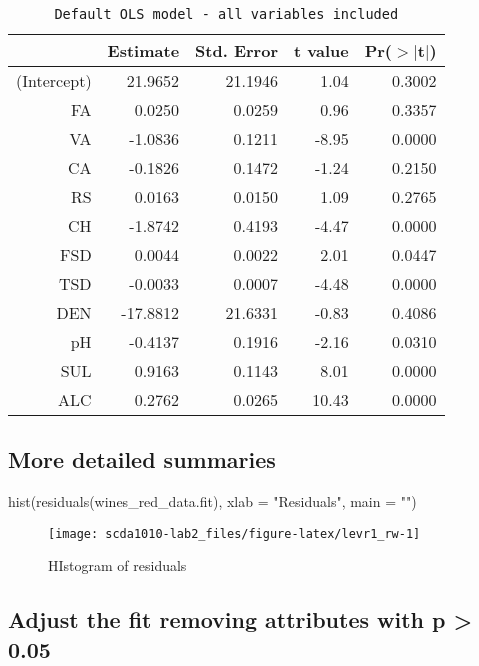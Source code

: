 \begin{table}[ht]
\centering
\begin{tabular}{rrrrr}
  \hline
 & Estimate & Std. Error & t value & Pr($>$$|$t$|$) \\ 
  \hline
(Intercept) & 21.9652 & 21.1946 & 1.04 & 0.3002 \\ 
  FA & 0.0250 & 0.0259 & 0.96 & 0.3357 \\ 
  VA & -1.0836 & 0.1211 & -8.95 & 0.0000 \\ 
  CA & -0.1826 & 0.1472 & -1.24 & 0.2150 \\ 
  RS & 0.0163 & 0.0150 & 1.09 & 0.2765 \\ 
  CH & -1.8742 & 0.4193 & -4.47 & 0.0000 \\ 
  FSD & 0.0044 & 0.0022 & 2.01 & 0.0447 \\ 
  TSD & -0.0033 & 0.0007 & -4.48 & 0.0000 \\ 
  DEN & -17.8812 & 21.6331 & -0.83 & 0.4086 \\ 
  pH & -0.4137 & 0.1916 & -2.16 & 0.0310 \\ 
  SUL & 0.9163 & 0.1143 & 8.01 & 0.0000 \\ 
  ALC & 0.2762 & 0.0265 & 10.43 & 0.0000 \\ 
   \hline
\end{tabular}
\caption{\tt Default OLS model - all variables included} 
\label{table:fit1}
\end{table}

\hypertarget{more-detailed-summaries}{%
\subsection{More detailed summaries}\label{more-detailed-summaries}}

\begin{Schunk}
\begin{Sinput}
hist(residuals(wines_red_data.fit), xlab = "Residuals", main = "")
\end{Sinput}
\begin{figure}[h]

{\centering \texttt{[image: scda1010-lab2\_files/figure-latex/levr1\_rw-1]} 

}

\caption[HIstogram of residuals]{HIstogram of residuals}\label{fig:levr1_rw}
\end{figure}
\end{Schunk}

\hypertarget{adjust-the-fit-removing-attributes-with-p-0.05}{%
\subsection{Adjust the fit removing attributes with p \textgreater{}
0.05}\label{adjust-the-fit-removing-attributes-with-p-0.05}}

